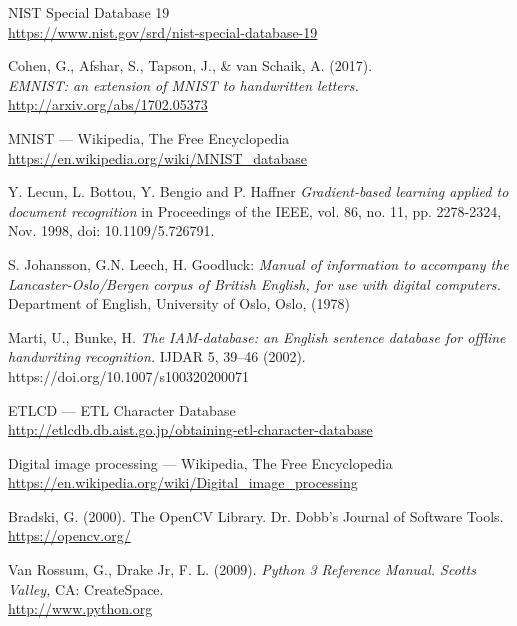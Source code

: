 \renewcommand\bibname{Ашигласан материал}
\begin{thebibliography}{99}
	NIST Special Database 19
	\\\url{https://www.nist.gov/srd/nist-special-database-19}

	Cohen, G., Afshar, S., Tapson, J., \& van Schaik, A. (2017).
	\\\textit{EMNIST: an extension of MNIST to handwritten letters.}
	\\\url{http://arxiv.org/abs/1702.05373}

	MNIST --- {W}ikipedia{,} The Free Encyclopedia
	\\\url{https://en.wikipedia.org/wiki/MNIST_database}

	Y. Lecun, L. Bottou, Y. Bengio and P. Haffner
	\textit{Gradient-based learning applied to document recognition} in Proceedings of the IEEE, vol. 86, no. 11, pp. 2278-2324, Nov. 1998, doi: 10.1109/5.726791.

	S. Johansson, G.N. Leech, H. Goodluck: \textit{Manual of information to accompany the Lancaster-Oslo/Bergen corpus of British English, for use with digital computers.} Department of English, University of Oslo, Oslo, (1978)

	Marti, U., Bunke, H. \textit{The IAM-database: an English sentence database for offline handwriting recognition.} IJDAR 5, 39–46 (2002). https://doi.org/10.1007/s100320200071

	ETLCD --- ETL Character Database
	\\\url{http://etlcdb.db.aist.go.jp/obtaining-etl-character-database}

	Digital image processing --- {W}ikipedia{,} The Free Encyclopedia
	\\\url{https://en.wikipedia.org/wiki/Digital_image_processing}

	Bradski, G. (2000). The OpenCV Library. Dr. Dobb's Journal of Software Tools.
	\\\url{https://opencv.org/}

	Van Rossum, G., Drake Jr, F. L. (2009). \textit{Python 3 Reference Manual. Scotts Valley,} CA: CreateSpace.
	\\\url{http://www.python.org}


\end{thebibliography}
